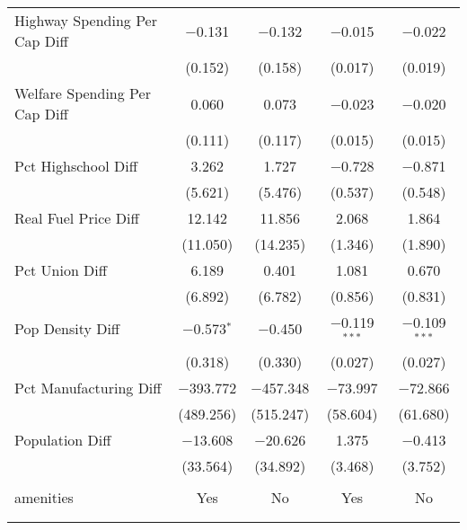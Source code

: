 \begin{table}[!htbp]
\begin{tabular}{@{\extracolsep{5pt}}lcccc}
  Highway Spending Per Cap Diff & $-$0.131 & $-$0.132 & $-$0.015 & $-$0.022 \\ 
  & (0.152) & (0.158) & (0.017) & (0.019) \\ 
  Welfare Spending Per Cap Diff & 0.060 & 0.073 & $-$0.023 & $-$0.020 \\ 
  & (0.111) & (0.117) & (0.015) & (0.015) \\ 
  Pct Highschool Diff & 3.262 & 1.727 & $-$0.728 & $-$0.871 \\ 
  & (5.621) & (5.476) & (0.537) & (0.548) \\ 
  Real Fuel Price Diff & 12.142 & 11.856 & 2.068 & 1.864 \\ 
  & (11.050) & (14.235) & (1.346) & (1.890) \\ 
  Pct Union Diff & 6.189 & 0.401 & 1.081 & 0.670 \\ 
  & (6.892) & (6.782) & (0.856) & (0.831) \\ 
  Pop Density Diff & $-$0.573$^{*}$ & $-$0.450 & $-$0.119$^{***}$ & $-$0.109$^{***}$ \\ 
  & (0.318) & (0.330) & (0.027) & (0.027) \\ 
  Pct Manufacturing Diff & $-$393.772 & $-$457.348 & $-$73.997 & $-$72.866 \\ 
  & (489.256) & (515.247) & (58.604) & (61.680) \\ 
  Population Diff & $-$13.608 & $-$20.626 & 1.375 & $-$0.413 \\ 
  & (33.564) & (34.892) & (3.468) & (3.752) \\ 
 \hline \\[-1.8ex] 
amenities & Yes & No & Yes & No \\ 
\hline \\[-1.8ex] 
\hline 
\hline \\[-1.8ex] 
\end{tabular} 
\end{table} 
